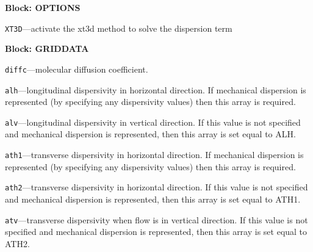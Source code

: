 
\item \textbf{Block: OPTIONS}

\begin{description}
\item \texttt{XT3D}---activate the xt3d method to solve the dispersion term

\end{description}
\item \textbf{Block: GRIDDATA}

\begin{description}
\item \texttt{diffc}---molecular diffusion coefficient.

\item \texttt{alh}---longitudinal dispersivity in horizontal direction.  If mechanical dispersion is represented (by specifying any dispersivity values) then this array is required.

\item \texttt{alv}---longitudinal dispersivity in vertical direction.  If this value is not specified and mechanical dispersion is represented, then this array is set equal to ALH.

\item \texttt{ath1}---transverse dispersivity in horizontal direction.  If mechanical dispersion is represented (by specifying any dispersivity values) then this array is required.

\item \texttt{ath2}---transverse dispersivity in horizontal direction.  If this value is not specified and mechanical dispersion is represented, then this array is set equal to ATH1.

\item \texttt{atv}---transverse dispersivity when flow is in vertical direction.  If this value is not specified and mechanical dispersion is represented, then this array is set equal to ATH2.

\end{description}

